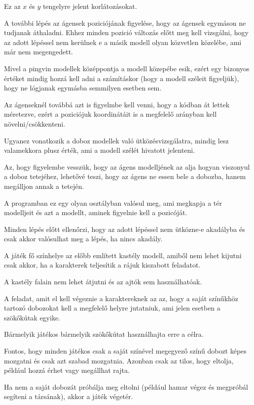 Ez az $x$ és $y$ tengelyre jelent korlátozásokat.

A további lépés az ágensek poziciójának figyelése, hogy az ágensek egymáson ne tudjanak áthaladni. Ehhez minden pozició változás előtt meg kell vizsgálni, hogy az adott lépéssel nem kerülnek e a másik modell olyan közvetlen közelébe, ami már nem megengedett.

Mivel a pingvin modellek középpontja a modell közepébe esik, ezért egy bizonyos értéket mindig hozzá kell adni a számításkor (hogy a modell széleit figyeljük), hogy ne lógjanak egymásba semmilyen esetben sem. 

Az ágenseknél továbbá azt is figyelmbe kell venni, hogy a kódban át lettek méretezve, ezért a poziciójuk koordinátáit is a megfelelő arányban kell növelni/csökkenteni.

Ugyanez vonatkozik a doboz modellek való ütközésvizsgálatra, mindig lesz valamekkora plusz érték, ami a modell szélét hivatott jelenteni.

Az, hogy figyelembe vesszük, hogy az ágens modelljének az alja hogyan viszonyul a doboz tetejéhez, lehetővé teszi, hogy az ágens ne essen bele a dobozba, hanem megálljon annak a tetején.

A programban ez egy olyan osztályban valósul meg, ami megkapja a tér modelljeit és azt a modellt, aminek figyelnie kell a pozicóját.
 
Minden lépés előtt ellenőrzi, hogy az adott lépéssel nem ütközne-e akadályba és csak akkor valósulhat meg a lépés, ha nincs akadály.


A játék fő színhelye az előbb említett kastély modell, amiből nem lehet kijutni csak akkor, ha a karakterek teljesítik a rájuk kiszabott feladatot.

A kastély falain nem lehet átjutni és az ajtók sem használhatóak.

A feladat, amit el kell végeznie a karaktereknek az az, hogy a saját színűkhöz tartozó dobozokat kell a megfelelő helyre jutatniuk, ami jelen esetben a szökőkútak egyike. 

Bármelyik játékos bármelyik szökőkútat használhajta erre a célra.

Fontos, hogy minden játékos csak a saját színével megegyező színű dobozt képes mozgatni és csak azt szabad mozgatnia. Azonban csak az tilos, hogy eltolja, például hozzá érhet vagy megállhat rajta. 

Ha nem a saját dobozát próbálja meg eltolni (például hamar végez és megpróbál segíteni a társának), akkor a játék végetér.

